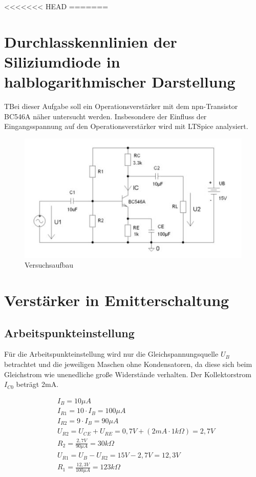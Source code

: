 \documentclass{article}
\begin{document}
<<<<<<< HEAD
=======
\section{Durchlasskennlinien der Siliziumdiode in halblogarithmischer Darstellung}
\begin{task}
  TBei dieser Aufgabe soll ein Operationsverstärker mit dem npn-Transistor BC546A näher untersucht werden.
  Insbesondere der Einfluss der Eingangsspannung auf den Operationsverstärker wird mit LTSpice analysiert.
\end{task}

\begin{figure}[h]
  \centering
  \includegraphics{../assets/images/EL1P3/aufbau aufgabe2.jpg}
  \caption{Versuchsaufbau}
  \label{fig:schalt2}
\end{figure}

\section{Verstärker in Emitterschaltung}

\subsection{Arbeitspunkteinstellung}
Für die Arbeitspunkteinstellung wird nur die Gleichspannungsquelle $U_B$ betrachtet und die jeweiligen Maschen ohne Kondensatoren, da diese sich beim Gleichstrom wie unenedliche große Widerstände verhalten.
Der Kollektorstrom $I_{C0}$ beträgt 2mA.

\begin{align*}
  &I_B = 10\mu A\\  
  &I_{R1}=10\cdot I_B = 100\mu A\\
  &I_{R2}= 9\cdot I_B = 90\mu A\\
  &U_{R2} = U_{CE} + U_{RE} = 0,7V + (2mA\cdot 1k\Omega) = 2,7V\\
  &R_{2} = \frac{2,7V}{90\mu A} = 30k\Omega\\
  &U_{R1} = U_B - U_{R2} = 15V - 2,7V = 12,3V\\
  &R_{1} = \frac{12,3V}{100\mu A}=123k\Omega
\end{align*}
\end{document}
